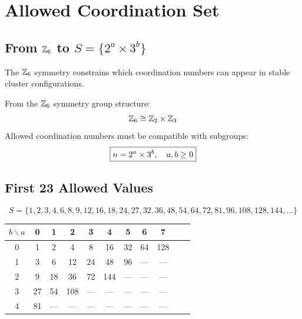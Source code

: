 \section{Allowed Coordination Set}
\label{sec:M6:allowed}

\subsection{From $\mathbb{Z}_6$ to $S = \{2^a \times 3^b\}$}

The $\mathbb{Z}_6$ symmetry constrains which coordination numbers can appear in
stable cluster configurations.

\begin{derivationbox}[title=Allowed Set Derivation]
    From the $\mathbb{Z}_6$ symmetry group structure: \tagI
    \begin{equation}
        \mathbb{Z}_6 \cong \mathbb{Z}_2 \times \mathbb{Z}_3
    \end{equation}
    Allowed coordination numbers must be compatible with subgroups:
    \begin{equation}
        \boxed{n = 2^a \times 3^b, \quad a, b \geq 0}
        \label{eq:allowed_set}
    \end{equation}
\end{derivationbox}

\subsection{First 23 Allowed Values}

\begin{equation}
    S = \{1, 2, 3, 4, 6, 8, 9, 12, 16, 18, 24, 27, 32, 36, 48, 54, 64, 72, 81, 96, 108, 128, 144, \ldots\}
\end{equation}

\begin{center}
\begin{tabular}{c|cccccccccc}
    \toprule
    $b \backslash a$ & 0 & 1 & 2 & 3 & 4 & 5 & 6 & 7 \\
    \midrule
    0 & 1 & 2 & 4 & 8 & 16 & 32 & 64 & 128 \\
    1 & 3 & 6 & 12 & 24 & 48 & 96 & --- & --- \\
    2 & 9 & 18 & 36 & 72 & 144 & --- & --- & --- \\
    3 & 27 & 54 & 108 & --- & --- & --- & --- & --- \\
    4 & 81 & --- & --- & --- & --- & --- & --- & --- \\
    \bottomrule
\end{tabular}
\end{center}

